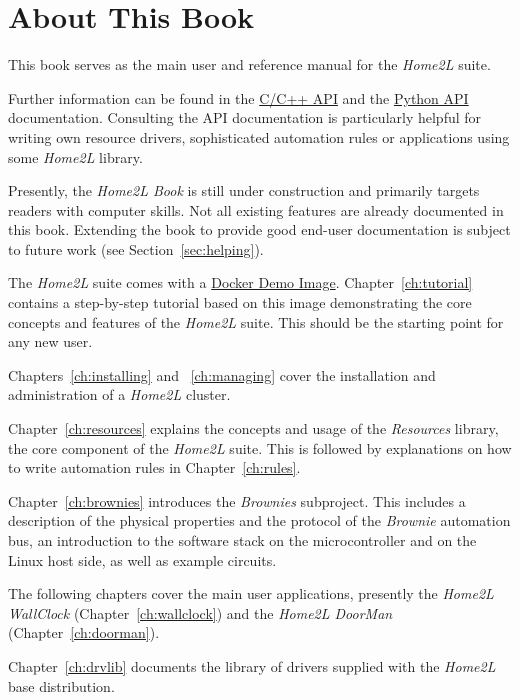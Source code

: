 \documentclass[12pt,english,parskip=half,headheight=19pt]{scrreprt}
\newcommand{\refdoc}[2]{\href{#1}{#2}}              %
\newcommand{\theapic}{\refdoc{home2l-api_c/index.html}{C/C++ API}}
\newcommand{\theapipython}{\refdoc{home2l-api_python/index.html}{Python API}}
\begin{document}
\clearpage
\section{About This Book}
\label{sec:intro-about}

This book serves as the main user and reference manual for the \textit{Home2L} suite.

Further information can be found in the \theapic{} and the \theapipython{} documentation.
Consulting the API documentation is particularly helpful for writing own resource drivers,
sophisticated automation rules or applications using some \textit{Home2L} library.

Presently, the \textit{Home2L Book} is still under construction and primarily targets readers
with computer skills. Not all existing features are already documented in this book.
Extending the book to provide good end-user documentation is subject to future work
(see Section~\ref{sec:helping}).

The \textit{Home2L} suite comes with a \hyperref[sec:tutorial-start]{Docker Demo Image}. Chapter~\ref{ch:tutorial} contains a step-by-step tutorial based on this image demonstrating the core concepts and features of the \textit{Home2L} suite. This should be the starting point for any new user.

Chapters~\ref{ch:installing} and ~\ref{ch:managing} cover the installation and administration of a \textit{Home2L} cluster.

Chapter~\ref{ch:resources} explains the concepts and usage of the \textit{Resources} library, the core component of the \textit{Home2L} suite. This is followed by explanations on how to write automation rules in Chapter~\ref{ch:rules}.

Chapter~\ref{ch:brownies} introduces the \textit{Brownies} subproject. This includes a description of the physical properties and the protocol of the \textit{Brownie} automation bus, an introduction to the software stack on the microcontroller and on the Linux host side, as well as example circuits.

The following chapters cover the main user applications, presently the \textit{Home2L WallClock} (Chapter~\ref{ch:wallclock}) and the \textit{Home2L DoorMan} (Chapter~\ref{ch:doorman}).

Chapter~\ref{ch:drvlib} documents the library of drivers supplied with the \textit{Home2L} base distribution.
\end{document}
